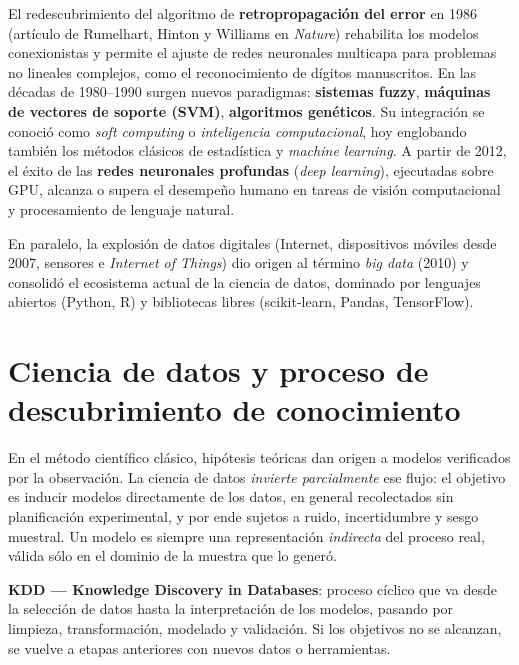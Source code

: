 El redescubrimiento del algoritmo de \textbf{retropropagación del error}
en 1986 (artículo de Rumelhart, Hinton y Williams en \emph{Nature})
rehabilita los modelos conexionistas y permite el ajuste de redes
neuronales multicapa para problemas no lineales complejos, como el
reconocimiento de dígitos manuscritos. En las décadas de 1980--1990
surgen nuevos paradigmas: \textbf{sistemas fuzzy}, \textbf{máquinas de
vectores de soporte (SVM)}, \textbf{algoritmos genéticos}. Su integración
se conoció como \emph{soft computing} o \emph{inteligencia
computacional}, hoy englobando también los métodos clásicos de
estadística y \emph{machine learning}. A partir de 2012, el éxito de las
\textbf{redes neuronales profundas} (\emph{deep learning}), ejecutadas
sobre GPU, alcanza o supera el desempeño humano en tareas de visión
computacional y procesamiento de lenguaje natural.

En paralelo, la explosión de datos digitales (Internet, dispositivos
móviles desde 2007, sensores e \emph{Internet of Things}) dio origen al
término \emph{big data} (2010) y consolidó el ecosistema actual de la
ciencia de datos, dominado por lenguajes abiertos (Python, R) y
bibliotecas libres (scikit-learn, Pandas, TensorFlow).

\section{Ciencia de datos y proceso de descubrimiento de conocimiento}

En el método científico clásico, hipótesis teóricas dan origen a modelos
verificados por la observación. La ciencia de datos \emph{invierte
parcialmente} ese flujo: el objetivo es inducir modelos directamente de
los datos, en general recolectados sin planificación experimental, y por
ende sujetos a ruido, incertidumbre y sesgo muestral. Un modelo es
siempre una representación \emph{indirecta} del proceso real, válida sólo
en el dominio de la muestra que lo generó.

\begin{conceito}
\textbf{KDD — Knowledge Discovery in Databases}: proceso cíclico que va
desde la selección de datos hasta la interpretación de los modelos,
pasando por limpieza, transformación, modelado y validación. Si los
objetivos no se alcanzan, se vuelve a etapas anteriores con nuevos datos
o herramientas.
\end{conceito}

